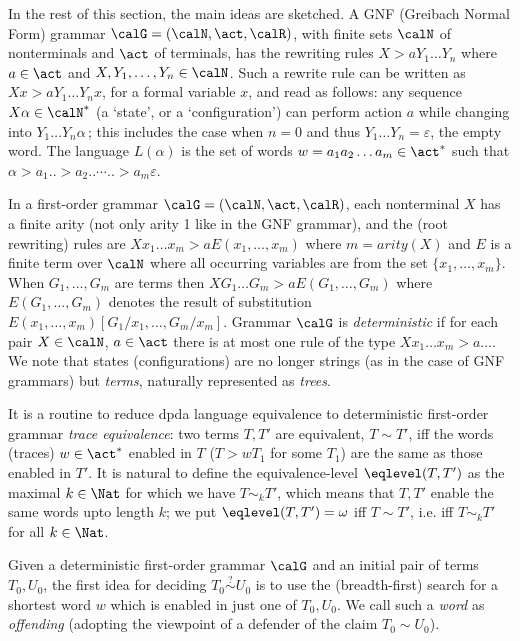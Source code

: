 \documentclass[12pt]{article}
\begin{document}
In the rest of this section, the main ideas are sketched.
A GNF (Greibach Normal Form) grammar $\calG=(\calN,\act,\calR)$, with finite sets
$\calN$ of nonterminals and $\act$ of terminals, 
has the rewriting rules 
$X\gt{}a Y_1\dots Y_n$ where $a\in\act$ and $X,Y_1,\dots,Y_n\in\calN$.
Such a rewrite rule can be written as  $Xx\gt{a} Y_1\dots Y_nx$, for a
formal variable $x$, and read as follows: 
any sequence $X\alpha\in\calN^*$ (a `state', or a `configuration') can perform
action $a$ while changing into  $Y_1\dots Y_n\alpha$\,;
this includes the case  when $n=0$ and thus $Y_1\dots Y_n=\varepsilon$, the
empty word.
The language $L(\alpha)$ is the set of words $w=a_1a_2\dots a_m\in\act^*$ such that 
$\alpha\gt{a_1}..\gt{a_2}..\cdots ..\gt{a_m}\varepsilon$. 

In a first-order grammar $\calG=(\calN,\act,\calR)$, each nonterminal $X$
has a finite arity (not only arity 1 like in the GNF grammar), 
and the (root rewriting) rules are $Xx_1\dots x_m\gt{a}E(x_1,\dots,x_m)$
where $m=arity(X)$ and $E$ is a finite term over $\calN$ where all
occurring variables are from the set $\{x_1,\dots,x_m\}$.
When $G_1,\dots,G_m$ are terms then 
 $XG_1\dots G_m\gt{a}E(G_1,\dots,G_m)$ where $E(G_1,\dots,G_m)$
 denotes the result of substitution
$E(x_1,\dots,x_m)[G_1/x_1,\dots,G_m/x_m]$.
Grammar $\calG$ is \emph{deterministic} if for each pair $X\in\calN$,
$a\in\act$ there is at most one rule of the type $Xx_1\dots x_m\gt{a}\dots$.
We note that states (configurations) are no longer strings (as in the
case of GNF grammars) but
\emph{terms}, naturally represented as \emph{trees}. 

It is a routine to reduce dpda language equivalence 
to deterministic first-order grammar \emph{trace equivalence}:
two terms $T,T'$ are equivalent, $T\sim T'$,
iff the words (traces) $w\in\act^*$ enabled in $T$
($T\gt{w}T_1$ for some $T_1$) are the same as those enabled in $T'$.
It is natural to define the equivalence-level
$\eqlevel(T,T')$  as the maximal $k\in\Nat$ for which we have 
$T\sim_k T'$, which means that 
$T,T'$ enable the same words upto length $k$; 
we put $\eqlevel(T,T')=\omega$ iff $T\sim T'$, i.e. iff  
$T\sim_k T'$ for all $k\in\Nat$.

Given a deterministic first-order grammar
$\calG$ and an initial pair of terms $T_0,U_0$,  the first idea for
deciding $T_0\stackrel{?}{\sim} U_0$ 
is to use the (breadth-first) search for a
shortest 
word $w$ which is enabled in just one of $T_0,U_0$.
We call such a
\emph{word} as \emph{offending} (adopting the viewpoint of a
defender of the claim $T_0\sim U_0$).
\end{document}
